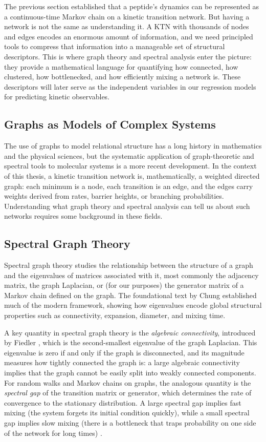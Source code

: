The previous section established that a peptide's dynamics can be represented as a continuous-time Markov chain on a kinetic transition network. But having a network is not the same as understanding it. A KTN with thousands of nodes and edges encodes an enormous amount of information, and we need principled tools to compress that information into a manageable set of structural descriptors. This is where graph theory and spectral analysis enter the picture: they provide a mathematical language for quantifying how connected, how clustered, how bottlenecked, and how efficiently mixing a network is. These descriptors will later serve as the independent variables in our regression models for predicting kinetic observables.

\subsection{Graphs as Models of Complex Systems}

The use of graphs to model relational structure has a long history in
mathematics and the physical sciences, but the systematic application of
graph-theoretic and spectral tools to molecular systems is a more recent
development. In the context of this thesis, a kinetic transition network is,
mathematically, a weighted directed graph: each minimum is a node, each
transition is an edge, and the edges carry weights derived from rates, barrier
heights, or branching probabilities. Understanding what graph theory and
spectral analysis can tell us about such networks requires some background in
these fields.

\subsection{Spectral Graph Theory}

Spectral graph theory studies the relationship between the structure of a
graph and the eigenvalues of matrices associated with it, most commonly the
adjacency matrix, the graph Laplacian, or (for our purposes) the generator
matrix of a Markov chain defined on the graph. The foundational text by
Chung \cite{Chung1997SpectralGraph} established much of the modern framework,
showing how eigenvalues encode global structural properties such as
connectivity, expansion, diameter, and mixing time.

A key quantity in spectral graph theory is the \emph{algebraic connectivity},
introduced by Fiedler \cite{Fiedler1973Algebraic}, which is the second-smallest
eigenvalue of the graph Laplacian. This eigenvalue is zero if and only if the
graph is disconnected, and its magnitude measures how tightly connected the
graph is: a large algebraic connectivity implies that the graph cannot be
easily split into weakly connected components. For random walks and Markov
chains on graphs, the analogous quantity is the \emph{spectral gap} of the
transition matrix or generator, which determines the rate of convergence to
the stationary distribution. A large spectral gap implies fast mixing (the
system forgets its initial condition quickly), while a small spectral gap
implies slow mixing (there is a bottleneck that traps probability on one side
of the network for long times) \cite{Chung1997SpectralGraph}.


